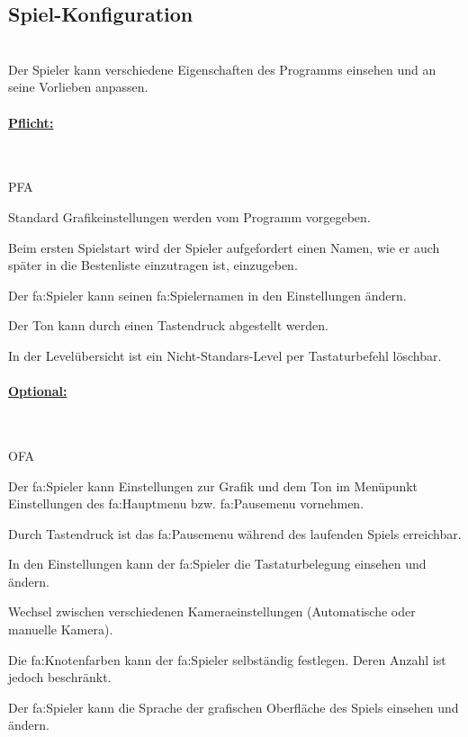 %
%


\subsection{Spiel-Konfiguration}

%
%
\renewcommand{\K}{}
%
%

~\\
Der Spieler kann verschiedene Eigenschaften des Programms einsehen und an seine Vorlieben anpassen.\\

%
%
\paragraph*{\underline{Pflicht:}}~\\

\begin{ids}{\gls{PFA\K}}

 	\id[ 10] Standard Grafikeinstellungen werden vom Programm vorgegeben.
 	
 	\id[ 15] Beim ersten Spielstart wird der Spieler aufgefordert einen Namen, wie er auch später in die Bestenliste einzutragen ist, einzugeben.
 		
 	\id[ 20] Der \gls{fa:Spieler} kann seinen \gls{fa:Spielername}n in den Einstellungen ändern.
 	
 	\id[ 25] Der Ton kann durch einen Tastendruck abgestellt werden.
 	
 	\id[ 27] In der Levelübersicht ist ein Nicht-Standars-Level per Tastaturbefehl löschbar.
	
\end{ids}


%
%
\paragraph*{\underline{Optional:}}~\\


\begin{ids}{\gls{OFA\K}}

	\id[ 30] Der \gls{fa:Spieler} kann Einstellungen zur Grafik und dem Ton im Menüpunkt Einstellungen des \gls{fa:Hauptmenu} bzw. \gls{fa:Pausemenu} vornehmen.
	
	\id[ 40] Durch Tastendruck ist das \gls{fa:Pausemenu} während des laufenden Spiels erreichbar.	
	
	\id[ 50] In den Einstellungen kann der \gls{fa:Spieler} die Tastaturbelegung einsehen und  ändern.
	
 	\id[60] Wechsel zwischen verschiedenen Kameraeinstellungen (Automatische oder manuelle Kamera).
 	
 	\id[ 70] Die \gls{fa:Knoten}farben kann der \gls{fa:Spieler} selbständig festlegen. Deren Anzahl ist jedoch beschränkt.
 	
 	\id[ 80] Der \gls{fa:Spieler} kann die Sprache der grafischen Oberfläche des Spiels einsehen und ändern.
 	
\end{ids}


